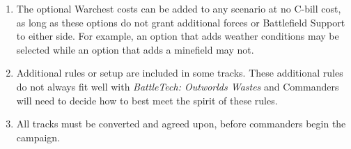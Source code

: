 \begin{enumerate}
\item The optional Warchest costs can be added to any scenario at no C-bill cost, as long as these options do not grant additional forces or Battlefield Support to either side.
For example, an option that adds weather conditions may be selected while an option that adds a minefield may not.

\item Additional rules or setup are included in some tracks.
These additional rules do not always fit well with \emph{BattleTech: Outworlds Wastes} and Commanders will need to decide how to best meet the spirit of these rules.

\item All tracks must be converted and agreed upon, before commanders begin the campaign.

\end{enumerate}
